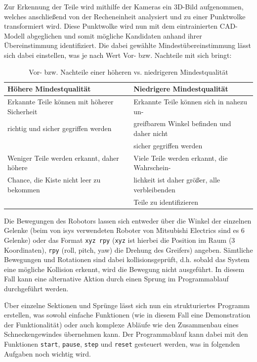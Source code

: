 Zur Erkennung der Teile wird mithilfe der Kameras ein 3D-Bild aufgenommen, welches
anschließend von der Recheneinheit analysiert und zu einer Punktwolke transformiert
wird. Diese Punktwolke wird nun mit dem eintrainierten CAD-Modell abgeglichen und
somit mögliche Kandidaten anhand ihrer Übereinstimmung identifiziert. Die dabei
gewählte Mindestübereinstimmung lässt sich dabei einstellen, was je nach Wert
Vor- bzw. Nachteile mit sich bringt:

\begin{table}[H]
	\begin{tabular}{| l || l |}
	\hline
	\textbf{Höhere Mindestqualität} & \textbf{ Niedrigere Mindestqualität}\\
	\hline\hline
	Erkannte Teile können mit höherer Sicherheit & Erkannte Teile können sich in nahezu un-\\
	richtig und sicher gegriffen werden & greifbarem Winkel befinden und daher nicht\\
	& sicher gegriffen werden\\
	\hline
	Weniger Teile werden erkannt, daher höhere & Viele Teile werden erkannt, die Wahrschein-\\
	Chance, die Kiste nicht leer zu bekommen & lichkeit ist daher größer, alle verbleibenden\\
	& Teile zu identifizieren\\
	\hline
	\end{tabular}
	\caption{Vor- bzw. Nachteile einer höheren vs. niedrigeren Mindestqualität}
	\label{tab:webtools-demo-mindestqualität}
\end{table}

Die Bewegungen des Robotors lassen sich entweder über die Winkel der einzelnen Gelenke
(beim von isys verwendeten Roboter von Mitsubishi Electrics sind es 6 Gelenke) oder
das Format \texttt{xyz rpy} (\texttt{xyz} ist hierbei die Position im Raum (3 Koordinaten),
\texttt{rpy} (roll, pitch, yaw) die Drehung des Greifers) angeben. Sämtliche Bewegungen
und Rotationen sind dabei kollisionsgeprüft, d.h. sobald das System eine mögliche
Kollision erkennt, wird die Bewegung nicht ausgeführt. In diesem Fall kann eine
alternative Aktion durch einen Sprung im Programmablauf durchgeführt werden.

Über einzelne Sektionen und Sprünge lässt sich nun ein strukturiertes Programm erstellen,
was sowohl einfache Funktionen (wie in diesem Fall eine Demonstration der Funktionalität)
oder auch komplexe Abläufe wie den Zusammenbau eines Schneckengewindes übernehmen
kann. Der Programmablauf kann dabei mit den Funktionen \texttt{start}, \texttt{pause},
\texttt{step} und \texttt{reset} gesteuert werden, was in folgenden Aufgaben noch
wichtig wird.

